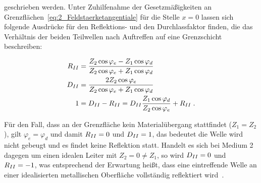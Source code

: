 geschrieben werden. Unter Zuhilfenahme der Gesetzmäßigkeiten an Grenzflächen~\eqref{eq:2_Feldstaerketangentiale} für die Stelle $x=0$ lassen sich folgende Ausdrücke für den Reflektions- und den Durchlassfaktor finden, die das Verhältnis der beiden Teilwellen nach Auftreffen auf eine Grenzschicht beschreiben:

\begin{align}
    R_{\uproman{2}} &= \frac{Z_2 \cos{\varphi_e} - Z_1 \cos{\varphi_d}}{Z_2 \cos{\varphi_e} + Z_1 \cos{\varphi_d}} \\
    D_{\uproman{2}} &= \frac{2 Z_2 \cos{\varphi_e}}{Z_2 \cos{\varphi_e} + Z_1 \cos{\varphi_d}} \\ 
    1 &= D_{\uproman{2}} - R_{\uproman{2}} = D_{\uproman{2}} \frac{Z_1 \cos{\varphi_d}}{Z_2 \cos{\varphi_e}} + R_{\uproman{2}} \; .
\end{align}

Für den Fall, dass an der Grenzfläche kein Materialübergang stattfindet ($Z_1 = Z_2$), gilt $\varphi_e = \varphi_d$ und damit $R_{\uproman{2}} = 0$ und $D_{\uproman{2}} = 1$, das bedeutet die Welle wird nicht gebeugt und es findet keine Reflektion statt. Handelt es sich bei Medium 2 dagegen um einen idealen Leiter mit $Z_2 = 0 \neq Z_1$, so wird $D_{\uproman{2}} = 0$ und $R_{\uproman{2}} = -1$, was entsprechend der Erwartung heißt, dass eine eintreffende Welle an einer idealisierten metallischen Oberfläche vollständig reflektiert wird~\cite{EM_Schirmung}. 






